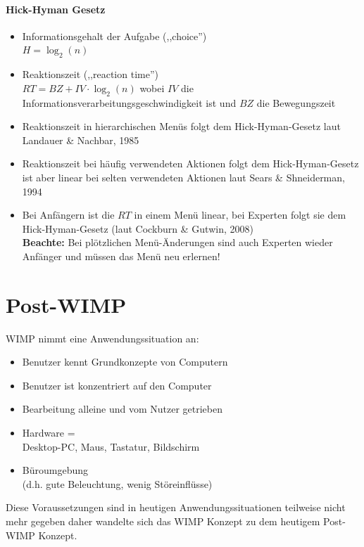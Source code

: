 \documentclass
[
	8pt,		%
	ngerman,	%
	a4paper,	%
	landscape,	%
	final		%
]{extarticle}
\begin{document}
\begin{multicols*}{4}
	\paragraph{Hick-Hyman Gesetz}
	\begin{itemize}
		\item Informationsgehalt der Aufgabe (,,choice'')\\
		      \(H = \log_{2}(n)\)
		\item Reaktionszeit (,,reaction time'')\\
			  \(RT = BZ + IV \cdot \log_{2}(n)\)
			  wobei \(IV\) die Informationsverarbeitungsgeschwindigkeit ist
			  und \(BZ\) die Bewegungszeit
		\item Reaktionszeit in hierarchischen Menüs folgt dem Hick-Hyman-Gesetz
		      laut Landauer \& Nachbar, 1985
		\item Reaktionszeit bei häufig verwendeten Aktionen folgt dem
		      Hick-Hyman-Gesetz ist aber linear bei selten verwendeten Aktionen
		      laut Sears \& Shneiderman, 1994
		\item Bei Anfängern ist die \(RT\) in einem Menü linear, bei Experten
		      folgt sie dem Hick-Hyman-Gesetz (laut Cockburn \& Gutwin, 2008) \\
		      \textbf{Beachte:} Bei plötzlichen Menü-Änderungen sind auch
		      Experten wieder Anfänger und müssen das Menü neu erlernen!
	\end{itemize}
	\section{Post-WIMP}
	WIMP nimmt eine Anwendungssituation an:
	\begin{itemize}
		\item Benutzer kennt Grundkonzepte von Computern
		\item Benutzer ist konzentriert auf den Computer
		\item Bearbeitung alleine und vom Nutzer getrieben
		\item Hardware = \\ Desktop-PC, Maus, Tastatur, Bildschirm
		\item Büroumgebung \\ (d.h. gute Beleuchtung, wenig Störeinflüsse)
	\end{itemize}
	Diese Voraussetzungen sind in heutigen Anwendungssituationen teilweise nicht
	mehr gegeben daher wandelte sich das WIMP Konzept zu dem heutigem Post-WIMP
	Konzept.

\end{multicols*}
\end{document}
